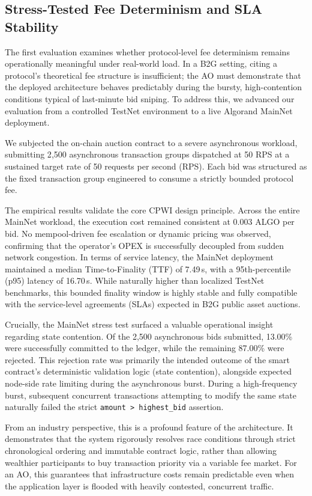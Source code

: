 \documentclass[runningheads]{llncs}
\begin{document}
\subsection{Stress-Tested Fee Determinism and SLA Stability}

The first evaluation examines whether protocol-level fee determinism remains operationally meaningful under real-world load. In a B2G setting, citing a protocol's theoretical fee structure is insufficient; the AO must demonstrate that the deployed architecture behaves predictably during the bursty, high-contention conditions typical of last-minute bid sniping. To address this, we advanced our evaluation from a controlled TestNet environment to a live Algorand MainNet deployment.

We subjected the on-chain auction contract to a severe asynchronous workload, submitting 2{,}500 asynchronous transaction groups dispatched at 50 RPS at a sustained target rate of 50 requests per second (RPS). Each bid was structured as the fixed transaction group engineered to consume a strictly bounded protocol fee. 

The empirical results validate the core CPWI design principle. Across the entire MainNet workload, the execution cost remained consistent at 0.003 ALGO per bid. No mempool-driven fee escalation or dynamic pricing was observed, confirming that the operator's OPEX is successfully decoupled from sudden network congestion. In terms of service latency, the MainNet deployment maintained a median Time-to-Finality (TTF) of 7.49\,s, with a 95th-percentile (p95) latency of 16.70\,s. While naturally higher than localized TestNet benchmarks, this bounded finality window is highly stable and fully compatible with the service-level agreements (SLAs) expected in B2G public asset auctions.

Crucially, the MainNet stress test surfaced a valuable operational insight regarding state contention. Of the 2{,}500 asynchronous bids submitted, 13.00\% were successfully committed to the ledger, while the remaining 87.00\% were rejected. This rejection rate was primarily the intended outcome of the smart contract's deterministic validation logic (state contention), alongside expected node-side rate limiting during the asynchronous burst. During a high-frequency burst, subsequent concurrent transactions attempting to modify the same state naturally failed the strict \texttt{amount > highest\_bid} assertion. 

From an industry perspective, this is a profound feature of the architecture. It demonstrates that the system rigorously resolves race conditions through strict chronological ordering and immutable contract logic, rather than allowing wealthier participants to buy transaction priority via a variable fee market. For an AO, this guarantees that infrastructure costs remain predictable even when the application layer is flooded with heavily contested, concurrent traffic.
\end{document}
